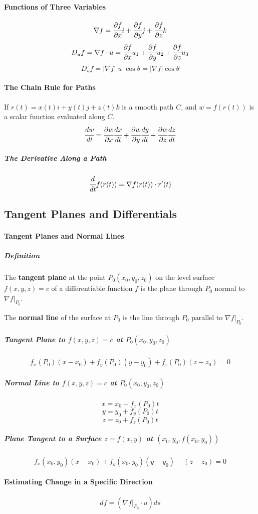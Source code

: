 \documentclass{article}
\begin{document}
            \paragraph{Functions of Three Variables}
                \[\nabla f=\cfrac{\partial f}{\partial x}i+\cfrac{\partial f}{\partial y}j+\cfrac{\partial f}{\partial z}k\]
                \[D_uf=\nabla f\cdot u=\cfrac{\partial f}{\partial x}u_1+\cfrac{\partial f}{\partial y}u_2+\cfrac{\partial f}{\partial z}u_3\]
                \[D_uf=|\nabla f||u|\cos\theta=|\nabla f|\cos\theta\]
            \paragraph{The Chain Rule for Paths}
                If $r(t)=x(t)i+y(t)j+z(t)k$ is a smooth path $C$, and $w=f(r(t))$ is a scalar function evaluated along $C$.
                \[\cfrac{dw}{dt}=\cfrac{\partial w}{\partial x}\cfrac{dx}{dt}+\cfrac{\partial w}{\partial y}\cfrac{dy}{dt}+\cfrac{\partial w}{\partial z}\cfrac{dz}{dt}\]
                \subparagraph{The Derivative Along a Path}
                    \[\cfrac{d}{dt}f(r(t))=\nabla f(r(t))\cdot r'(t)\]
        \subsection{Tangent Planes and Differentials}
            \paragraph{Tangent Planes and Normal Lines}
                \subparagraph{Definition} The \textbf{tangent plane} at the point $P_0(x_0,y_0,z_0)$ on the level surface $f(x,y,z)=c$ of a differentiable function $f$ is the plane through $P_0$ normal to $\nabla f|_{P_0}$.
                \par The \textbf{normal line} of the surface at $P_0$ is the line through $P_0$ parallel to $\nabla f|_{P_0}$.
                \subparagraph{Tangent Plane to $f(x,y,z)=c$ at $P_0(x_0,y_0,z_0)$}
                \[f_x(P_0)(x-x_0)+f_y(P_0)(y-y_0)+f_z(P_0)(z-z_0)=0\]
                \subparagraph{Normal Line to $f(x,y,z)=c$ at $P_0(x_0,y_0,z_0)$}
                \[x=x_0+f_x(P_0)t\]
                \[y=y_0+f_y(P_0)t\]
                \[z=z_0+f_z(P_0)t\]
                \subparagraph{Plane Tangent to a Surface $z=f(x,y)$ at $(x_0,y_0,f(x_0,y_0))$}
                \[f_x(x_0,y_0)(x-x_0)+f_y(x_0,y_0)(y-y_0)-(z-z_0)=0\]
            \paragraph{Estimating Change in a Specific Direction}
                \[df=(\nabla f|_{P_0}\cdot u) ds\]
\end{document}
